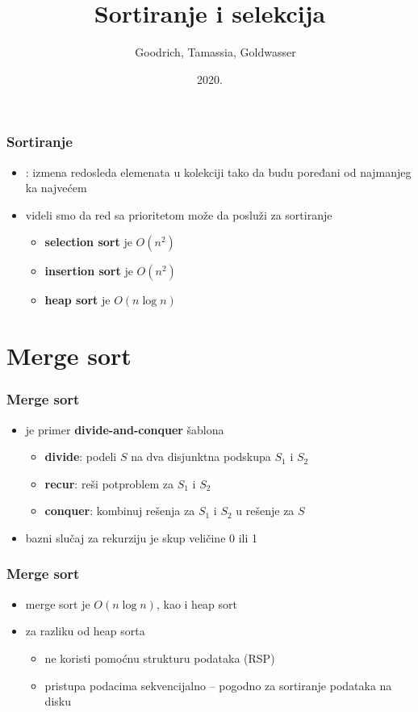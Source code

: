 \documentclass[compress,aspectratio=169]{beamer}
\title{Sortiranje i selekcija}
\author{\textcopyright \ \ Goodrich, Tamassia, Goldwasser}
\institute{Katedra za informatiku, Fakultet tehničkih nauka, Univerzitet u
Novom Sadu}
\date{2020.}
\begin{document}
\frame{\titlepage}

\begin{frame}[fragile]
  \frametitle{Sortiranje}
  \begin{itemize}
    \item {}: izmena redosleda elemenata u kolekciji tako da budu poređani od najmanjeg ka najvećem 
    \item videli smo da red sa prioritetom može da posluži za sortiranje
    \begin{itemize}
      \item \textbf{selection sort} je $O(n^2)$
      \item \textbf{insertion sort} je $O(n^2)$ 
      \item \textbf{heap sort} je $O(n\log n)$
    \end{itemize}
  \end{itemize}
\end{frame}

\section[Merge sort]{Merge sort}

\begin{frame}[fragile]
  \frametitle{Merge sort}
  \begin{itemize}
    \item {} je primer \textbf{divide-and-conquer} šablona 
    \begin{itemize}
      \item \textbf{divide}: podeli $S$ na dva disjunktna podskupa $S_1$ i $S_2$
      \item \textbf{recur}: reši potproblem za $S_1$ i $S_2$ 
      \item \textbf{conquer}: kombinuj rešenja za $S_1$ i $S_2$ u rešenje za $S$
    \end{itemize}
    \item bazni slučaj za rekurziju je skup veličine 0 ili 1 
  \end{itemize}
\end{frame}

\begin{frame}[fragile]
  \frametitle{Merge sort}
  \begin{itemize}
    \item merge sort je $O(n\log n)$, kao i heap sort
    \item za razliku od heap sorta 
    \begin{itemize}
      \item ne koristi pomoćnu strukturu podataka (RSP)
      \item pristupa podacima sekvencijalno -- pogodno za sortiranje podataka na disku
    \end{itemize}
  \end{itemize}
\end{frame}
\end{document}

